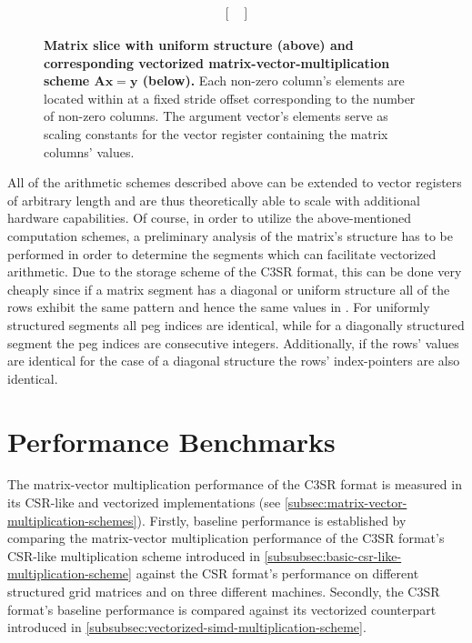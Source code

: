 \documentclass{article}
\begin{document}
\begin{figure}[ht]
$$\begin{matrix}
\begin{bmatrix}
                                                                                     \end{bmatrix}
        \end{matrix}
        $$
        \caption[Matrix slice with uniform structure and corresponding vectorized matrix-vector-multiplication scheme.]{\textbf{Matrix slice with uniform structure (above) and corresponding vectorized matrix-vector-multiplication scheme $\bm{Ax=y}$ (below).} Each non-zero column's elements are located within \V at a fixed stride offset corresponding to the number of non-zero columns. The argument vector's elements serve as scaling constants for the vector register containing the matrix columns' values.}
        \label{fig:simd_scheme_uniform}
      \end{figure}

      All of the arithmetic schemes described above can be extended to vector registers of arbitrary length and are thus theoretically able to scale with additional hardware capabilities. Of course, in order to utilize the above-mentioned computation schemes, a preliminary analysis of the matrix's structure has to be performed in order to determine the segments which can facilitate vectorized arithmetic. Due to the storage scheme of the C3SR format, this can be done very cheaply since if a matrix segment has a diagonal or uniform structure all of the rows exhibit the same pattern and hence the same values in \JS. For uniformly structured segments all peg indices are identical, while for a diagonally structured segment the peg indices are consecutive integers. Additionally, if the rows' values are identical for the case of a diagonal structure the rows' index-pointers \VS are also identical.

\section{Performance Benchmarks}

  The matrix-vector multiplication performance of the C3SR format is measured in its CSR-like and vectorized implementations (see \ref{subsec:matrix-vector-multiplication-schemes}). Firstly, baseline performance is established by comparing the matrix-vector multiplication performance of the C3SR format's CSR-like multiplication scheme introduced in \ref{subsubsec:basic-csr-like-multiplication-scheme} against the CSR format's performance on different structured grid matrices and on three different machines. Secondly, the C3SR format's baseline performance is compared against its vectorized counterpart introduced in \ref{subsubsec:vectorized-simd-multiplication-scheme}.
\end{document}
